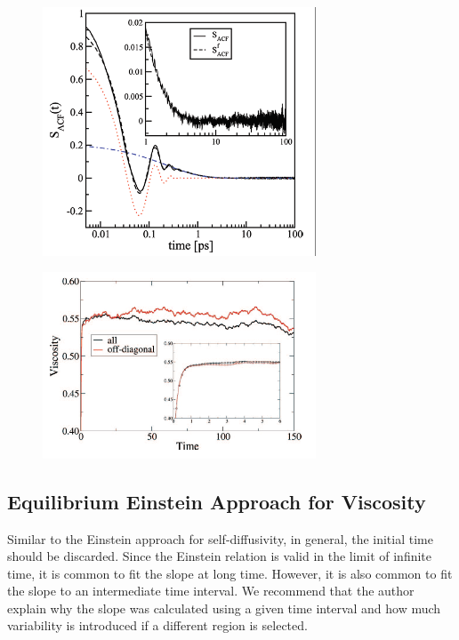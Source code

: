\documentclass[9pt]{livecoms}
\begin{document}
\begin{figure}[htb!]
	\centering
	\includegraphics[width=3.2in]{figures/FanourgakisFig1.png}
	\caption{}
	\label{fig:FanourgakisFig1}
\end{figure}

\begin{figure}[htb!]
	\centering
	\includegraphics[width=3.2in]{figures/ChenFig1.png}
	\caption{}
	\label{fig:ChenFig1}
\end{figure}

\subsection{Equilibrium Einstein Approach for Viscosity}

Similar to the Einstein approach for self-diffusivity, in general, the initial time should be discarded. Since the Einstein relation is valid in the limit of infinite time, it is common to fit the slope at long time. However, it is also common to fit the slope to an intermediate time interval. We recommend that the author explain why the slope was calculated using a given time interval and how much variability is introduced if a different region is selected.
\end{document}
